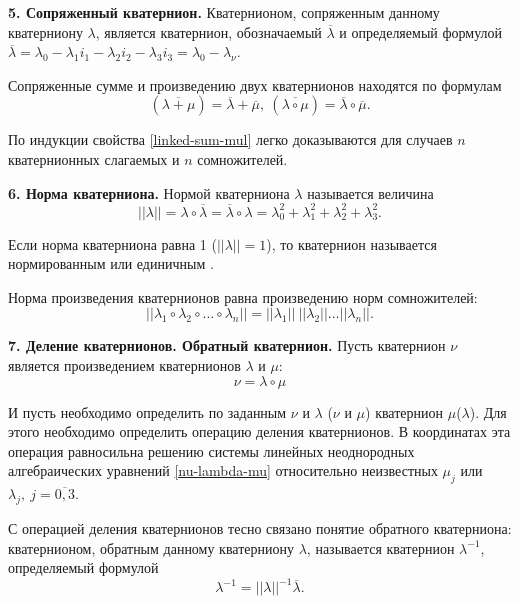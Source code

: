 \documentclass[14pt]{extreport}
\begin{document}
\textbf{5. Сопряженный кватернион.} Кватернионом, сопряженным данному кватерниону $\lambda$, является кватернион, обозначаемый $\overline{\lambda}$ и определяемый формулой $\overline{\lambda}=\lambda_{0}-\lambda_{1}i_{1}-\lambda_{2}i_{2}-\lambda_{3}i_{3}=\lambda_{0}-\lambda_{\nu}$.

Сопряженные сумме и произведению двух кватернионов находятся
по формулам
\begin{equation}
\label{linked-sum-mul}
(\overline{\lambda+\mu})=\overline{\lambda}+\overline{\mu},\ (\overline{\lambda\circ\mu})=\overline{\lambda}\circ\overline{\mu}.
\end{equation}

По индукции свойства \eqref{linked-sum-mul} легко доказываются для случаев $n$ кватернионных слагаемых и $n$ сомножителей.

\textbf{6. Норма кватерниона.} Нормой кватерниона $\lambda$ называется величина 
\begin{equation}
||\lambda|| = \lambda \circ \overline{\lambda} = \overline{\lambda} \circ \lambda = \lambda_{0}^{2}+\lambda_{1}^{2}+\lambda_{2}^{2}+\lambda_{3}^{2}.
\end{equation}

Если норма кватерниона равна 1 ($||\lambda|| = 1$), то кватернион называется нормированным или единичным \cite{demidovich}.

Норма произведения кватернионов равна произведению норм сомножителей: 
\begin{equation}
||\lambda_{1} \circ \lambda_{2} \circ \dots \circ \lambda_{n}|| = ||\lambda_{1}||\ ||\lambda_{2}|| \dots ||\lambda_{n}||.
\end{equation}

\textbf{7. Деление кватернионов. Обратный кватернион.} Пусть кватернион $\nu$ является произведением кватернионов $\lambda$ и $\mu$:
\begin{equation}
\label{res-nu-mul-lambda-mu}
\nu=\lambda \circ \mu
\end{equation}

И пусть необходимо определить по заданным $\nu$ и $\lambda$ ($\nu$ и $\mu$) кватернион $\mu$($\lambda$). Для этого необходимо определить операцию деления кватернионов. В координатах эта операция равносильна решению системы линейных неоднородных алгебраических уравнений \eqref{nu-lambda-mu} относительно неизвестных $\mu_{j}$ или $\lambda_{j},\ j=\overline{0,3}.$

С операцией деления кватернионов тесно связано понятие обратного кватерниона: кватернионом, обратным данному кватерниону $\lambda$, называется кватернион $\lambda^{-1}$, определяемый формулой
\begin{equation}
\lambda^{-1}=||\lambda||^{-1}\overline{\lambda}.
\end{equation}
\end{document}
